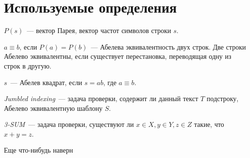 \section{Используемые определения}
$P(s)$~--- вектор Парея, вектор частот символов строки $s$.

$a \equiv b$, если $P(a) = P(b)$~--- Абелева эквивалентность двух строк. Две строки Абелево эквивалентны, если существует перестановка, переводящая одну из строк в другую.

$s$~--- Абелев квадрат, если $s=ab$, где $a \equiv b$.

\textit{Jumbled indexing}~--- задача проверки, содержит ли данный текст $T$ подстроку, Абелево эквивалентную шаблону $S$.

\textit{3-SUM}~--- задача проверки, существуют ли $x \in X, y \in Y, z \in Z$ такие, что $x+y=z$.

Еще что-нибудь наверн